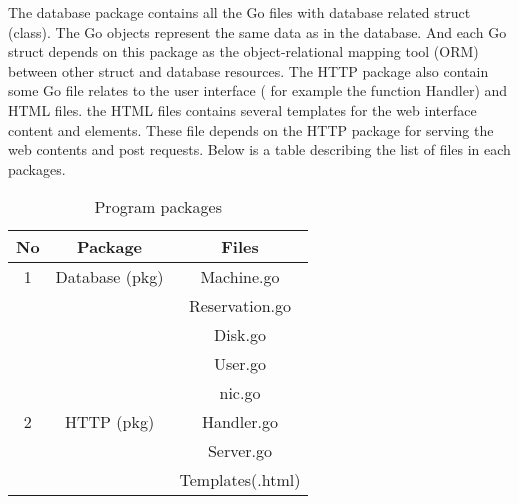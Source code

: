 The database package contains all the Go files with database related struct (class). The Go objects represent the same data as in the database. And each Go struct depends on this package as the object-relational mapping tool (ORM) between other struct and database resources. The HTTP package also contain some Go file relates to the user interface ( for example the function Handler) and HTML files. the HTML files contains several templates for the web interface content and elements. These file depends on the HTTP package for serving the web contents and post requests. Below is a table describing the list of files in each packages.
\pagebreak
\begin{table}[h!]
  \centering
  \label{tab:table1}
  \begin{tabular}{ccc}
    \hline
    No & Package & Files\\
   \hline
    1 &Database (pkg)& Machine.go\\
       &&Reservation.go\\
      &&Disk.go\\
      &&User.go\\
      &&nic.go\\
    \hline
    2 &HTTP (pkg)& Handler.go\\
    &&Server.go\\
    &&Templates(.html)\\
    \hline
  \end{tabular}
  \caption{Program packages}
\end{table}

